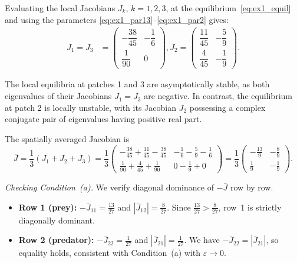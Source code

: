 \documentclass[12pt,a4paper]{article}
\theoremstyle{definition}
\begin{document}
Evaluating the local Jacobians $J_k$, $k=1,2,3$, at the
equilibrium~\eqref{eq:ex1_equil} and using the parameters
\eqref{eq:ex1_par13}--\eqref{eq:ex1_par2} gives:
\begin{align*}
  J_1 = J_3
  &= \begin{pmatrix}
       -\dfrac{38}{45} & -\dfrac{1}{6} \\[8pt]
        \dfrac{1}{90}  &  0
     \end{pmatrix},
  J_2
  = \begin{pmatrix}
       \dfrac{11}{45} & -\dfrac{5}{9} \\[8pt]
       \dfrac{4}{45}  & -\dfrac{1}{9}
     \end{pmatrix}.
\end{align*}

The local equilibria at patches 1 and 3 are asymptotically stable, as both eigenvalues of their Jacobians $  J_1 = J_3  $ are negative. In contrast, the equilibrium at patch 2 is locally unstable, with its Jacobian $  J_2  $ possessing a complex conjugate pair of eigenvalues having positive real part. 

\medskip
The spatially averaged Jacobian is
\begin{equation*}
  \bar{J}
  = \frac{1}{3}(J_1 + J_2 + J_3)
  = \frac{1}{3}
    \begin{pmatrix}
      -\tfrac{38}{45} + \tfrac{11}{45} - \tfrac{38}{45}
      & -\tfrac{1}{6} - \tfrac{5}{9} - \tfrac{1}{6} \\[6pt]
      \tfrac{1}{90} + \tfrac{4}{45} + \tfrac{1}{90}
      & 0 - \tfrac{1}{9} + 0
    \end{pmatrix}
  = \frac{1}{3}
    \begin{pmatrix}
      -\tfrac{13}{9} & -\tfrac{8}{9} \\[4pt] \tfrac{1}{9} & -\tfrac{1}{9}
    \end{pmatrix}.
  \label{eq:ex1_Jbar}
\end{equation*}

\medskip
\noindent\textit{Checking Condition~(a).}
We verify diagonal dominance of $-\bar{J}$ row by row.
\begin{itemize}[itemsep=4pt]
  \item \textbf{Row 1 (prey):}
    $-\bar{J}_{11} = \tfrac{13}{27}$ and
    $|\bar{J}_{12}| = \tfrac{8}{27}$.
    Since $\tfrac{13}{27} > \tfrac{8}{27}$, row~1 is strictly
    diagonally dominant. 
  \item \textbf{Row 2 (predator):}
    $-\bar{J}_{22} = \tfrac{1}{27}$ and
    $|\bar{J}_{21}| = \tfrac{1}{27}$.
    We have $-\bar{J}_{22} = |\bar{J}_{21}|$, so equality holds,
    consistent with Condition~(a) with $\varepsilon \to 0$.
\end{itemize}
\end{document}
